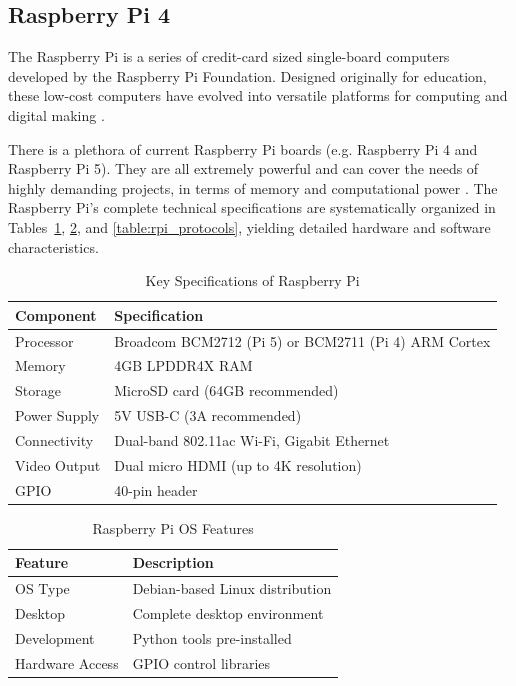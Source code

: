 \subsection{Raspberry Pi 4} 
{
	The Raspberry Pi is a series of credit-card sized single-board computers developed by the Raspberry Pi Foundation. Designed originally for education, these low-cost computers have evolved into versatile platforms for computing and digital making \cite{Raspberry}.
	
	There is a plethora of current Raspberry Pi boards (e.g. Raspberry Pi 4 and Raspberry Pi 5). They are all extremely powerful and can cover the needs of highly demanding projects, in terms of memory and computational power \cite{Raspberry}. The Raspberry Pi's complete technical specifications are systematically organized in Tables~\ref{table:rpi_specs}, \ref{table:rpi_os}, and \ref{table:rpi_protocols}, yielding detailed hardware and software characteristics.
	 
	\begin{table}[h]
		\centering
		\caption{Key Specifications of Raspberry Pi}
		\label{table:rpi_specs}
		\begin{tabular}{|l|l|}
			\hline
			\textbf{Component} & \textbf{Specification} \\ \hline
			Processor & Broadcom BCM2712 (Pi 5) or BCM2711 (Pi 4) ARM Cortex \\ \hline
			Memory & 4GB LPDDR4X RAM \\ \hline
			Storage & MicroSD card (64GB recommended) \\ \hline
			Power Supply & 5V USB-C (3A recommended) \\ \hline
			Connectivity & Dual-band 802.11ac Wi-Fi, Gigabit Ethernet \\ \hline
			Video Output & Dual micro HDMI (up to 4K resolution) \\ \hline
			GPIO & 40-pin header \\ \hline
		\end{tabular}
	\end{table}
	
	\begin{table}[h]
		\centering
		\caption{Raspberry Pi OS Features}
		\label{table:rpi_os}
		\begin{tabular}{|l|l|}
			\hline
			\textbf{Feature} & \textbf{Description} \\ \hline
			OS Type & Debian-based Linux distribution \\ \hline
			Desktop & Complete desktop environment \\ \hline
			Development & Python tools pre-installed \\ \hline
			Hardware Access & GPIO control libraries \\ \hline
		\end{tabular}
	\end{table}
	
}
